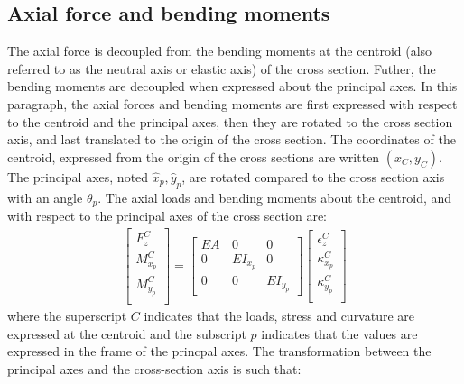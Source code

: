 \documentclass[11pt]{article}
\newcommand{\cent}{{C}}
\newcommand{\EA}{{E\!A}\,}
\newcommand{\EI}{E\!I}
\begin{document}
% 
\subsection{Axial force and bending moments}
The axial force is decoupled from the bending moments at the centroid (also referred to as the neutral axis or elastic axis) of the cross section. 
Futher, the bending moments are decoupled when expressed about the principal axes.
In this paragraph, the axial forces and bending moments are first expressed with respect to the centroid and the principal axes, then they are rotated to the cross section axis, and last translated to the origin of the cross section.
% 
The coordinates of the centroid, expressed from the origin of the cross sections are written $(x_\cent,y_\cent)$.
The principal axes, noted $\hat{x}_p,\hat{y}_p$, are rotated compared to the cross section axis with an angle $\theta_p$.
% 
The axial loads and bending moments about the centroid, and with respect to the principal axes of the cross section are:
\begin{align}
    \begin{bmatrix}F_z^\cent \\ M_{x_p}^\cent \\ M_{y_p}^\cent\\ \end{bmatrix}
    =
    \begin{bmatrix}\EA & 0 & 0\\0 & \EI_{x_p} & 0\\0 & 0& \EI_{y_p}\end{bmatrix}
    \begin{bmatrix}\epsilon_z^\cent \\ \kappa_{x_p}^\cent \\ \kappa_{y_p}^\cent\\ \end{bmatrix}
\end{align}
where the superscript $\cent$ indicates that the loads, stress and curvature are expressed at the centroid and the subscript $p$ indicates that the values are expressed in the frame of the princpal axes.
The transformation between the principal axes and the cross-section axis is such that:
\end{document}
